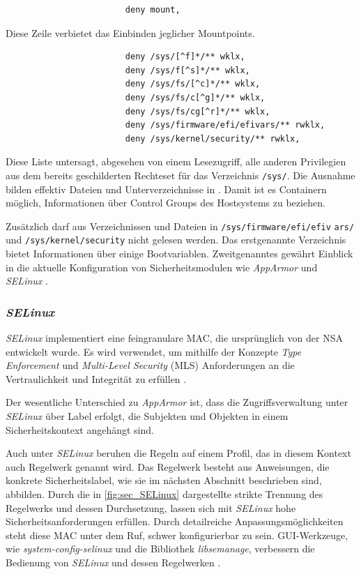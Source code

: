 \documentclass[../main.tex]{subfiles}
\begin{document}
					\begin{lstlisting}
						deny mount,
					\end{lstlisting}
					Diese Zeile verbietet das Einbinden jeglicher Mountpoints.

					\begin{lstlisting}
						deny /sys/[^f]*/** wklx,
						deny /sys/f[^s]*/** wklx,
						deny /sys/fs/[^c]*/** wklx,
						deny /sys/fs/c[^g]*/** wklx,
						deny /sys/fs/cg[^r]*/** wklx,
						deny /sys/firmware/efi/efivars/** rwklx,
						deny /sys/kernel/security/** rwklx,
					\end{lstlisting}
					Diese Liste untersagt, abgesehen von einem Lesezugriff, alle anderen Privilegien aus dem bereits geschilderten Rechteset für das Verzeichnis \texttt{/sys/}. Die Ausnahme bilden effektiv Dateien und Unterverzeichnisse in . Damit ist es Containern möglich, Informationen über Control Groups des Hostsystems zu beziehen.

					Zusätzlich darf aus Verzeichnissen und Dateien in \texttt{/sys/firmware/efi/efiv} \texttt{ars/} und \texttt{/sys/kernel/security} nicht gelesen werden. Das erstgenannte Verzeichnis bietet Informationen über einige Bootvariablen. Zweitgenanntes gewährt Einblick in die aktuelle Konfiguration von Sicherheitsmodulen wie \emph{AppArmor} und \emph{SELinux} \cite{apparmorEFI}\cite{apparmorSecurityFS}\cite{apparmorLWNSecurityFS}.

  		\subsubsection{\emph{SELinux}}
			\label{selinux}
				\emph{SELinux} implementiert eine feingranulare MAC, die ursprünglich von der \acrshort{NSA} entwickelt wurde. Es wird verwendet, um mithilfe der Konzepte \emph{Type Enforcement} und \emph{Multi-Level Security} (\acrshort{MLS}) Anforderungen an die Vertraulichkeit und Integrität zu erfüllen \cite{redhatSec}. %

				Der wesentliche Unterschied zu \emph{AppArmor} ist, dass die Zugriffsverwaltung unter \emph{SELinux} über Label erfolgt, die Subjekten und Objekten in einem Sicherheitskontext angehängt sind.


				Auch unter \emph{SELinux} beruhen die Regeln auf einem Profil, das in diesem Kontext auch Regelwerk genannt wird. Das Regelwerk besteht aus Anweisungen, die konkrete Sicherheitslabel, wie sie im nächsten Abschnitt beschrieben sind, abbilden. Durch die in \fig \ref{fig:sec_SELinux} dargestellte strikte Trennung des Regelwerks und dessen Durchsetzung, lassen sich mit \emph{SELinux} hohe Sicherheitsanforderungen erfüllen. Durch detailreiche Anpassungsmöglichkeiten steht diese MAC unter dem Ruf, schwer konfigurierbar zu sein. \acrshort{GUI}-Werkzeuge, wie \emph{system-config-selinux} und die Bibliothek \emph{libsemanage}, verbessern die Bedienung von \emph{SELinux} und dessen Regelwerken \cite[S.62,67]{linuxMagazineSec}.
\end{document}
